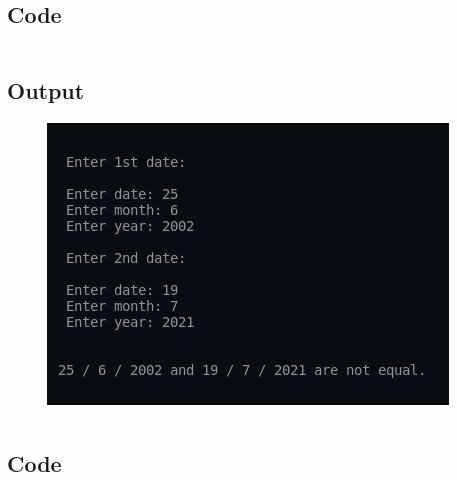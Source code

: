\documentclass[12pt]{article}
\begin{document}
\section{}
\subsection{Code}
\inputminted{c}{q2.c}
\newpage
\subsection{Output}
\begin{figure}[h]
    \centering
    \includegraphics{2.png}
\end{figure}

\newpage
\section{}
\subsection{Code}
\inputminted{c}{q3.c}
\newpage
\end{document}
